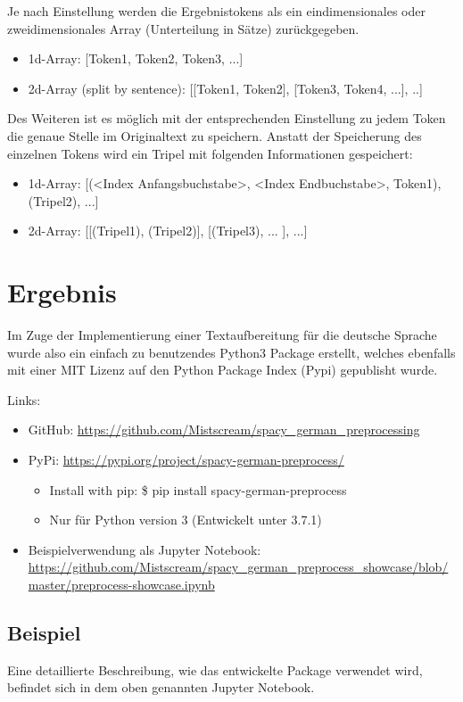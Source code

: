 Je nach Einstellung werden die Ergebnistokens als ein eindimensionales oder zweidimensionales Array (Unterteilung in Sätze) zurückgegeben.
\begin{itemize}
\item 1d-Array: [Token1, Token2, Token3, ...]
\item 2d-Array (split by sentence): [[Token1, Token2], [Token3, Token4, ...], ..]
\end{itemize}
Des Weiteren ist es möglich  mit der entsprechenden Einstellung zu jedem Token die genaue Stelle im Originaltext zu speichern. Anstatt der Speicherung des einzelnen Tokens wird ein Tripel mit folgenden Informationen gespeichert: 
\begin{itemize}
\item 1d-Array: [(<Index Anfangsbuchstabe>, <Index Endbuchstabe>, Token1), (Tripel2), ...]
\item 2d-Array: [[(Tripel1), (Tripel2)], [(Tripel3), ... ], ...]
\end{itemize}

\section{Ergebnis}
Im Zuge der Implementierung einer Textaufbereitung für die deutsche Sprache wurde also ein einfach zu benutzendes Python3 Package erstellt, welches ebenfalls mit einer MIT Lizenz auf den Python Package Index (Pypi) gepublisht wurde. 

Links:
\begin{itemize}
\item GitHub: \url{https://github.com/Mistscream/spacy_german_preprocessing}
\item PyPi: \url{https://pypi.org/project/spacy-german-preprocess/}
\begin{itemize}
\item Install with pip: \$ pip install spacy-german-preprocess
\item Nur für Python version 3 (Entwickelt unter 3.7.1)
\end{itemize}
\item Beispielverwendung als Jupyter Notebook: \url{https://github.com/Mistscream/spacy_german_preprocess_showcase/blob/master/preprocess-showcase.ipynb}
\end{itemize}

\subsection{Beispiel}
Eine detaillierte Beschreibung, wie das entwickelte Package verwendet wird, befindet sich in dem oben genannten Jupyter Notebook.

